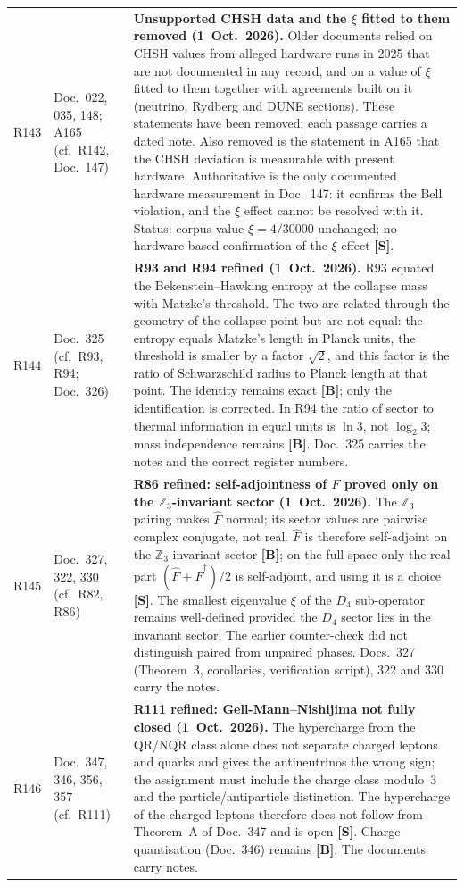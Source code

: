\begin{longtable}{@{}p{0.9cm}p{3.1cm}p{10.2cm}@{}}
R143 & Doc.~022, 035, 148; A165 (cf.\ R142, Doc.~147) & \textbf{Unsupported CHSH data and the $\xi$ fitted to them removed (1~Oct.~2026).} Older documents relied on CHSH values from alleged hardware runs in 2025 that are not documented in any record, and on a value of $\xi$ fitted to them together with agreements built on it (neutrino, Rydberg and DUNE sections). These statements have been removed; each passage carries a dated note. Also removed is the statement in A165 that the CHSH deviation is measurable with present hardware. Authoritative is the only documented hardware measurement in Doc.~147: it confirms the Bell violation, and the $\xi$ effect cannot be resolved with it. Status: corpus value $\xi = 4/30000$ unchanged; no hardware-based confirmation of the $\xi$ effect \textbf{[S]}. \\
R144 & Doc.~325 (cf.\ R93, R94; Doc.~326) & \textbf{R93 and R94 refined (1~Oct.~2026).} R93 equated the Bekenstein--Hawking entropy at the collapse mass with Matzke's threshold. The two are related through the geometry of the collapse point but are not equal: the entropy equals Matzke's length in Planck units, the threshold is smaller by a factor $\sqrt{2}$, and this factor is the ratio of Schwarzschild radius to Planck length at that point. The identity remains exact \textbf{[B]}; only the identification is corrected. In R94 the ratio of sector to thermal information in equal units is $\ln 3$, not $\log_2 3$; mass independence remains \textbf{[B]}. Doc.~325 carries the notes and the correct register numbers. \\
R145 & Doc.~327, 322, 330 (cf.\ R82, R86) & \textbf{R86 refined: self-adjointness of $\hat{F}$ proved only on the $\mathbb{Z}_3$-invariant sector (1~Oct.~2026).} The $\mathbb{Z}_3$ pairing makes $\hat{F}$ normal; its sector values are pairwise complex conjugate, not real. $\hat{F}$ is therefore self-adjoint on the $\mathbb{Z}_3$-invariant sector \textbf{[B]}; on the full space only the real part $(\hat{F}+\hat{F}^\dagger)/2$ is self-adjoint, and using it is a choice \textbf{[S]}. The smallest eigenvalue $\xi$ of the $D_4$ sub-operator remains well-defined provided the $D_4$ sector lies in the invariant sector. The earlier counter-check did not distinguish paired from unpaired phases. Docs.~327 (Theorem~3, corollaries, verification script), 322 and 330 carry the notes. \\
R146 & Doc.~347, 346, 356, 357 (cf.\ R111) & \textbf{R111 refined: Gell-Mann--Nishijima not fully closed (1~Oct.~2026).} The hypercharge from the QR/NQR class alone does not separate charged leptons and quarks and gives the antineutrinos the wrong sign; the assignment must include the charge class modulo~3 and the particle/antiparticle distinction. The hypercharge of the charged leptons therefore does not follow from Theorem~A of Doc.~347 and is open \textbf{[S]}. Charge quantisation (Doc.~346) remains \textbf{[B]}. The documents carry notes. \\

\end{longtable}
